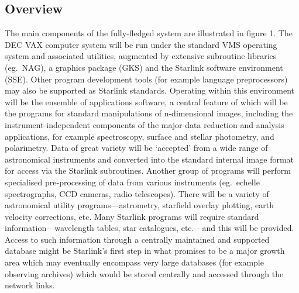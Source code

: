 \subsection {Overview}
The main components of the fully-fledged system are illustrated in figure 1.
The DEC VAX computer system will be run under the standard VMS operating system
and associated utilities, augmented by extensive subroutine libraries
(eg.\ NAG), a graphics package (GKS) and the Starlink software environment
(SSE).
Other program development tools (for example language preprocessors) may also
be supported as Starlink standards.
Operating within this environment will be the ensemble of applications software,
a central feature of which will be the programs for standard manipulations of
n-dimensional images, including the instrument-independent components of the
major data reduction and analysis applications, for example spectroscopy,
surface and stellar photometry, and polarimetry.
Data of great variety will be `accepted' from a wide range of astronomical
instruments and converted into the standard internal image format for access
via the Starlink subroutines.
Another group of programs will perform specialised pre-processing of data from
various instruments (eg.\ echelle spectrographs, CCD cameras, radio telescopes).
There will be a variety of astronomical utility programs---astrometry,
starfield overlay plotting, earth velocity corrections, etc.  Many Starlink
programs will require  standard information---wavelength tables, star
catalogues, etc.---and this will be provided.
Access to such information through a centrally maintained and supported database
might be Starlink's first step in what promises to be a major growth area which
may eventually encompass very large databases (for example observing archives)
which would be stored centrally and accessed through the network links.
